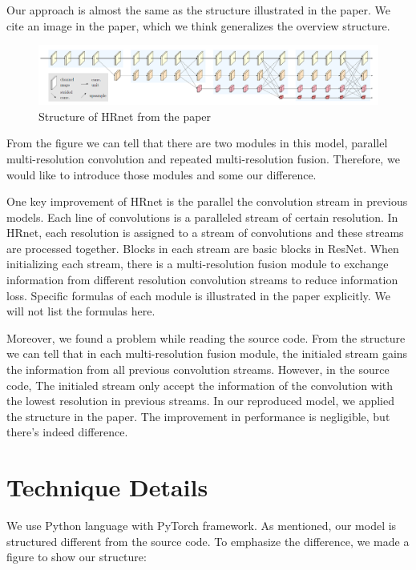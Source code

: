 \documentclass[10pt,twocolumn,letterpaper]{article}
\begin{document}
Our approach is almost the same as the structure illustrated in the paper.
We cite an image in the paper, which we think generalizes the overview structure.

\begin{figure}[h]
   \begin{center}
      \includegraphics[width=0.8\linewidth]{2.png}
   \end{center}
      \caption{Structure of HRnet from the paper}
   \label{fig:long}
   \label{fig:onecol}
\end{figure}

From the figure we can tell that there are two modules in this model,
parallel multi-resolution convolution and repeated multi-resolution fusion.
Therefore, we would like to introduce those modules and some our difference.

One key improvement of HRnet is the parallel the convolution stream in previous models.
Each line of convolutions is a paralleled stream of certain resolution.
In HRnet, each resolution is assigned to a stream of convolutions
and these streams are processed together.
Blocks in each stream are basic blocks in ResNet.
When initializing each stream,
there is a multi-resolution fusion module to exchange information from different resolution convolution streams to reduce information loss.
Specific formulas of each module is illustrated in the paper explicitly.
We will not list the formulas here.

Moreover, we found a problem while reading the source code.
From the structure we can tell that
in each multi-resolution fusion module,
the initialed stream gains the information from all previous convolution streams.
However, in the source code,
The initialed stream only accept the information of the convolution with the lowest resolution in previous streams.
In our reproduced model, we applied the structure in the paper.
The improvement in performance is negligible,
but there's indeed difference.

\section{Technique Details}

We use Python language with PyTorch framework.
As mentioned, our model is structured different from the source code.
To emphasize the difference,
we made a figure to show our structure:
\end{document}
